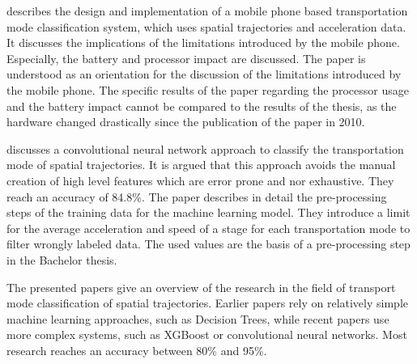 \cite{Reddy2010} describes the design and implementation of a mobile phone based transportation mode classification system, which uses spatial trajectories and acceleration data. It discusses the implications of the limitations introduced by the mobile phone. Especially, the battery and processor impact are discussed.\newline
The paper is understood as an orientation for the discussion of the limitations introduced by the mobile phone. The specific results of the paper regarding the processor usage and the battery impact cannot be compared to the results of the thesis, as the hardware changed drastically since the publication of the paper in 2010.

\cite{Dabiri2018} discusses a convolutional neural network approach to classify the transportation mode of spatial trajectories. It is argued that this approach avoids the manual creation of high level features which are error prone and nor exhaustive. They reach an accuracy of 84.8\%.\newline
The paper describes in detail the pre-processing steps of the training data for the machine learning model. They introduce a limit for the average acceleration and speed of a stage for each transportation mode to filter wrongly labeled data. The used values are the basis of a pre-processing step in the Bachelor thesis.

The presented papers give an overview of the research in the field of transport mode classification of spatial trajectories. Earlier papers rely on relatively simple machine learning approaches, such as Decision Trees, while recent papers use more complex systems, such as XGBoost or convolutional neural networks. Most research reaches an accuracy between 80\% and 95\%. \cite{Zheng2008} \cite{Xiao2017} \cite{Dabiri2018}
